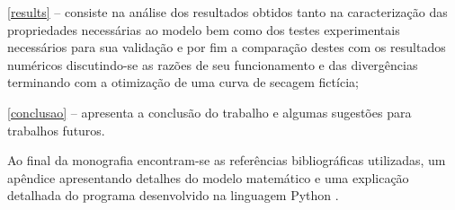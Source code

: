 \autoref{results} – consiste na análise dos resultados obtidos tanto na
caracterização das propriedades necessárias ao modelo bem como dos testes
experimentais necessários para sua validação e por fim a comparação destes com
os resultados numéricos discutindo-se as razões de seu funcionamento e das
divergências terminando com a otimização de uma curva de secagem fictícia;

\autoref{conclusao} – apresenta a conclusão do trabalho e algumas sugestões para
trabalhos futuros.
    
Ao final da monografia encontram-se as referências bibliográficas utilizadas, um
apêndice apresentando detalhes do modelo matemático e uma explicação detalhada
do programa desenvolvido na linguagem Python \cite{python}.
